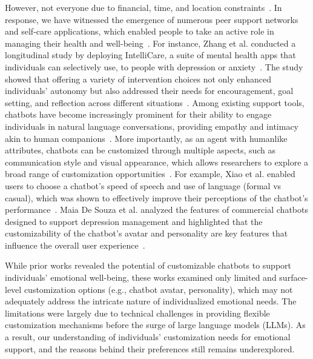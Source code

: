 However, not everyone  due to financial, time, and location constraints~\cite{brouwers2020social, WHO2019MentalDisorder, wainberg2017challenges}. In response, we have witnessed the emergence of numerous peer support networks and self-care applications, which enabled people to take an active role in managing their health and well-being~\cite{renwen_2021_customization, six2022effect, paul2021customizability, kim2019toward, gao2022taking}. For instance, Zhang et al. conducted a longitudinal study by deploying IntelliCare, a suite of mental health apps that individuals can selectively use, to people with depression or anxiety~\cite{renwen_2021_customization}. The study showed that offering a variety of intervention choices not only enhanced individuals' autonomy but also addressed their needs for encouragement, goal setting, and reflection across different situations~\cite{renwen_2021_customization}. 
Among  existing support tools, chatbots have become increasingly prominent for their ability to engage individuals in natural language conversations, providing empathy and intimacy akin to human companions~\cite{Alaa2019Review, Aditya2019Review, Fitzpatrick2017CBT, Skjuve2021Companion, lee2019caring}.
More importantly, as an agent with humanlike attributes, chatbots can be customized through multiple aspects, such as communication style and visual appearance, which allows researchers to explore a broad range of customization opportunities~\cite{deSouza2022Design, Aditya2019Review, Alaa2019Review, Haque2023Overview, Xiao2007Customization}. 
For example, Xiao et al. enabled users to choose a chatbot's speed of speech and use of language (formal vs casual), which was shown to effectively improve their perceptions of the chatbot's performance~\cite{Xiao2007Customization}. Maia De Souza et al. analyzed the features of commercial chatbots designed to support depression management and highlighted that the customizability of the chatbot's avatar and personality are key features that influence the overall user experience~\cite{deSouza2022Design}.

While prior works revealed the potential of customizable chatbots to support individuals' emotional well-being, these works examined only limited and surface-level customization options (e.g., chatbot avatar, personality), which may not adequately address the intricate nature of individualized emotional needs. The limitations were largely due to technical challenges in providing flexible customization mechanisms before the surge of large language models (LLMs). As a result, our understanding of individuals' customization needs for emotional support, and the reasons behind their preferences still remains underexplored.

